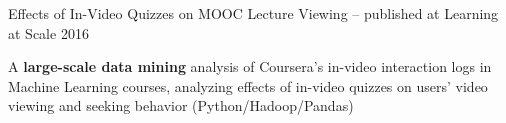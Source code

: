 \documentclass[margin,line]{resume}
\begin{document}
\begin{resume}
\vspace{-2mm}

Effects of In-Video Quizzes on MOOC Lecture Viewing -- published at Learning at Scale 2016
\begin{compactitem}
\item A \textbf{large-scale data mining} analysis of Coursera's in-video interaction logs in Machine Learning courses, analyzing effects of in-video quizzes on users' video viewing and seeking behavior (Python/Hadoop/Pandas)
\end{compactitem}



\end{resume}
\end{document}
